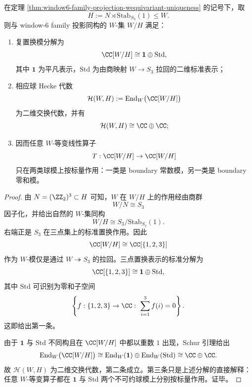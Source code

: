 \begin{theorem}\label{thm:window6-family-projection-spherical-hecke-two-modes}
在定理 \ref{thm:window6-family-projection-wequivariant-uniqueness} 的记号下，取
\[
H:=N\rtimes \mathrm{Stab}_{S_3}(1)\le W.
\]
则与 window-\(6\) family 投影同构的 \(W\)-集 \(W/H\) 满足：
\begin{enumerate}
  \item 复置换模分解为
  \[
  \CC[W/H]\cong \mathbf 1\oplus \mathrm{Std},
  \]
  其中 \(\mathbf 1\) 为平凡表示，\(\mathrm{Std}\) 为由商映射 \(W\to S_3\) 拉回的二维标准表示；
  \item 相应球 Hecke 代数
  \[
  \mathcal H(W,H):=\operatorname{End}_W\bigl(\CC[W/H]\bigr)
  \]
  为二维交换代数，并有
  \[
  \mathcal H(W,H)\cong \CC\oplus \CC;
  \]
  \item 因而任意 \(W\)-等变线性算子
  \[
  T:\CC[W/H]\to \CC[W/H]
  \]
  只在两类球模上按标量作用：一类是 boundary 常数模，另一类是 boundary 零和模。
\end{enumerate}
\end{theorem}
\begin{proof}
由 \(N=(\ZZ_2)^3\subset H\) 可知，\(W\) 在 \(W/H\) 上的作用经由商群
\[
W/N\cong S_3
\]
因子化，并给出自然的 \(W\)-集同构
\[
W/H\cong S_3/\mathrm{Stab}_{S_3}(1).
\]
右端正是 \(S_3\) 在三点集上的标准置换作用。因此
\[
\CC[W/H]\cong \CC[\{1,2,3\}]
\]
作为 \(W\)-模仅是通过 \(W\twoheadrightarrow S_3\) 的拉回。三点置换表示的标准分解为
\[
\CC[\{1,2,3\}]
\cong
\mathbf 1\oplus \mathrm{Std},
\]
其中 \(\mathrm{Std}\) 可识别为零和子空间
\[
\left\{f:\{1,2,3\}\to \CC:\ \sum_{i=1}^3 f(i)=0\right\}.
\]
这即给出第一条。

由于 \(\mathbf 1\) 与 \(\mathrm{Std}\) 不同构且在 \(\CC[W/H]\) 中都以重数 \(1\) 出现，Schur 引理给出
\[
\operatorname{End}_W\bigl(\CC[W/H]\bigr)
\cong
\operatorname{End}_W(\mathbf 1)\oplus \operatorname{End}_W(\mathrm{Std})
\cong
\CC\oplus \CC.
\]
故 \(\mathcal H(W,H)\) 为二维交换代数，第二条成立。第三条只是上述分解的直接解释：任意 \(W\)-等变算子都在 \(\mathbf 1\) 与 \(\mathrm{Std}\) 两个不可约球模上分别按标量作用。证毕。
\end{proof}

